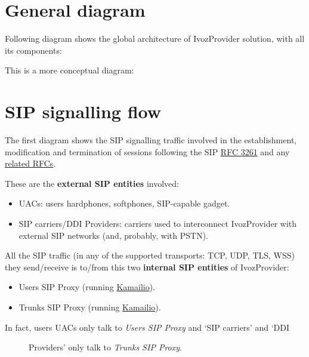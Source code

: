 \documentclass[letterpaper,10pt,spanish]{sphinxmanual}
\begin{document}
\section{General diagram}
\label{basic_concepts/architecture/index:general-diagram}
Following diagram shows the global architecture of IvozProvider solution,
with all its components:

\noindent{}

This is a more conceptual diagram:

\noindent{}


\section{SIP signalling flow}
\label{basic_concepts/architecture/index:sip-signalling-flow}\label{basic_concepts/architecture/index:signallingflow}
The first diagram shows the SIP signalling traffic involved in the
establishment, modification and termination of sessions following the SIP
\href{https://tools.ietf.org/html/rfc3261}{RFC 3261} and any \href{https://www.packetizer.com/ipmc/sip/standards.html}{related RFCs}.

These are the \textbf{external SIP entities} involved:
\begin{itemize}
\item {} 
UACs: users hardphones, softphones, SIP-capable gadget.

\item {} 
SIP carriers/DDI Providers: carriers used to interconnect IvozProvider with external SIP
networks (and, probably, with PSTN).

\end{itemize}

All the SIP traffic (in any of the supported transports: TCP, UDP, TLS, WSS)
they send/receive is to/from this two \textbf{internal SIP entities} of IvozProvider:
\begin{itemize}
\item {} 
Users SIP Proxy (running \href{https://www.kamailio.org}{Kamailio}).

\item {} 
Trunks SIP Proxy (running \href{https://www.kamailio.org}{Kamailio}).

\end{itemize}
\begin{description}
\item[{In fact, users UACs only talk to \emph{Users SIP Proxy} and `SIP carriers' and `DDI}] \leavevmode
Providers' only talk to \emph{Trunks SIP Proxy}.

\end{description}
\end{document}
